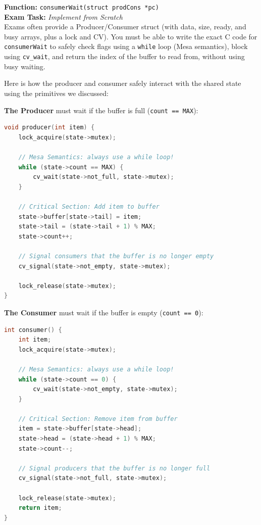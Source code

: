\begin{tcolorbox}[colback=red!5!white, colframe=red!75!black, title=\textbf{! EXAM FOCUS: IMPLEMENTATION REQUIRED}]
\textbf{Function:} \texttt{consumerWait(struct prodCons *pc)} \\
\textbf{Exam Task:} \textit{Implement from Scratch} \\
Exams often provide a Producer/Consumer struct (with data, size, ready, and busy arrays, plus a lock and CV). You must be able to write the exact C code for \texttt{consumerWait} to safely check flags using a \texttt{while} loop (Mesa semantics), block using \texttt{cv\_wait}, and return the index of the buffer to read from, without using busy waiting.
\end{tcolorbox}

Here is how the producer and consumer safely interact with the shared state using the primitives we discussed:

\textbf{The Producer} must wait if the buffer is full (\texttt{count == MAX}):
\begin{lstlisting}[language=C]
void producer(int item) {
    lock_acquire(state->mutex);
    
    // Mesa Semantics: always use a while loop!
    while (state->count == MAX) {
        cv_wait(state->not_full, state->mutex);
    }
    
    // Critical Section: Add item to buffer
    state->buffer[state->tail] = item;
    state->tail = (state->tail + 1) % MAX;
    state->count++;
    
    // Signal consumers that the buffer is no longer empty
    cv_signal(state->not_empty, state->mutex);
    
    lock_release(state->mutex);
}
\end{lstlisting}

\textbf{The Consumer} must wait if the buffer is empty (\texttt{count == 0}):
\begin{lstlisting}[language=C]
int consumer() {
    int item;
    lock_acquire(state->mutex);
    
    // Mesa Semantics: always use a while loop!
    while (state->count == 0) {
        cv_wait(state->not_empty, state->mutex);
    }
    
    // Critical Section: Remove item from buffer
    item = state->buffer[state->head];
    state->head = (state->head + 1) % MAX;
    state->count--;
    
    // Signal producers that the buffer is no longer full
    cv_signal(state->not_full, state->mutex);
    
    lock_release(state->mutex);
    return item;
}
\end{lstlisting}

